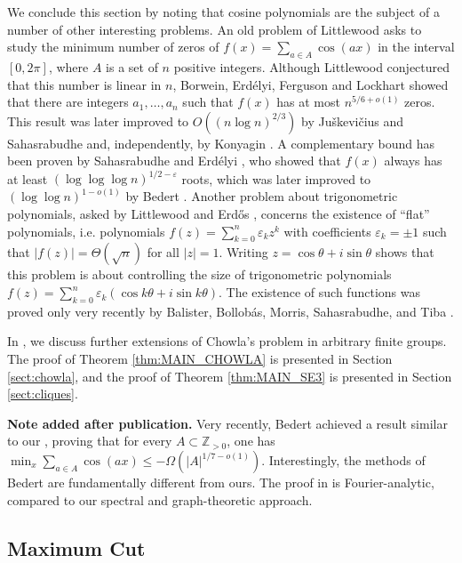 \documentclass[11pt]{article}
\theoremstyle{plain}
\theoremstyle{definition}
\newcommand{\eps}{\varepsilon}
\begin{document}
\medskip

We conclude this section by noting that cosine polynomials are the subject of a number of other interesting problems. An old problem of Littlewood \cite{L68} asks to study the minimum number of zeros of $f(x)=\sum_{a\in A} \cos(a x)$ in the interval $[0, 2\pi]$, where $A$ is a set of $n$ positive integers. Although Littlewood conjectured that this number is linear in $n$, Borwein, Erd\'elyi, Ferguson and Lockhart \cite{BEFL08} showed that there are integers $a_1, \dots, a_n$ such that $f(x)$ has at most $n^{5/6+o(1)}$ zeros. This result was later improved to $O((n\log n)^{2/3})$ by Ju\v skevi\v cius and Sahasrabudhe \cite{JS21} and, independently, by Konyagin \cite{K20}. A complementary bound has been proven by Sahasrabudhe \cite{S19} and Erd\'elyi \cite{E16, E20}, who showed that $f(x)$ always has at least $(\log\log\log n)^{1/2-\eps}$ roots, which was later improved to $(\log\log n)^{1-o(1)}$ by Bedert \cite{B24}. Another problem about trigonometric polynomials, asked by Littlewood \cite{L66} and Erd\H{o}s \cite{E57}, concerns the existence of ``flat'' polynomials, i.e. polynomials $f(z)=\sum_{k=0}^n \eps_k z^k$ with coefficients $\eps_k=\pm 1$ such that $|f(z)|=\Theta(\sqrt{n})$ for all $|z|=1$. Writing $z=\cos\theta+i\sin\theta$ shows that this problem is about controlling the size of trigonometric polynomials  $f(z)=\sum_{k=0}^n \eps_k (\cos k\theta+i\sin k\theta)$. The existence of such functions was proved only very recently by Balister, Bollob\'as, Morris, Sahasrabudhe, and Tiba \cite{BBMST24}.

In , we discuss further extensions of Chowla's problem in arbitrary finite groups. 
The proof of Theorem \ref{thm:MAIN_CHOWLA} is presented in Section \ref{sect:chowla}, and the proof of Theorem \ref{thm:MAIN_SE3} is presented in Section \ref{sect:cliques}.

\medskip

\noindent
\textbf{Note added after publication.} Very recently, Bedert \cite{B25} achieved a result similar to our , proving that for every $A\subset \mathbb{Z}_{>0}$, one has $\min_x \sum_{a\in A}\cos(ax)\leq -\Omega(|A|^{1/7-o(1)})$. Interestingly, the methods of Bedert are fundamentally different from ours. The proof in \cite{B25} is Fourier-analytic, compared to our spectral and graph-theoretic approach.

\subsection{Maximum Cut}\label{subsec:intro_maxcut}
\end{document}
